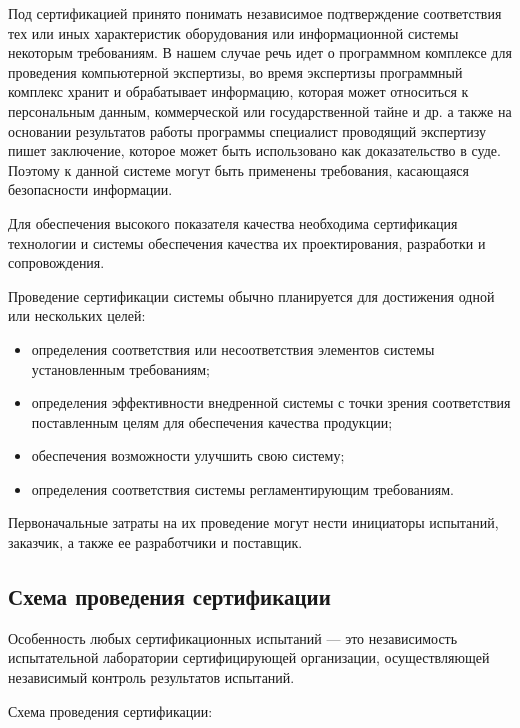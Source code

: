 Под сертификацией принято понимать независимое подтверждение соответствия тех или иных характеристик оборудования или информационной системы некоторым требованиям. В нашем случае речь идет о программном комплексе для проведения компьютерной экспертизы, во время экспертизы программный комплекс хранит и обрабатывает информацию, которая может относиться к персональным данным, коммерческой или государственной тайне и др. а также на основании результатов работы программы специалист проводящий экспертизу пишет заключение, которое может быть использовано как доказательство в суде. Поэтому к данной системе могут быть применены требования, касающаяся безопасности информации.

Для обеспечения высокого показателя качества необходима сертификация технологии и системы обеспечения качества их проектирования, разработки и сопровождения.

Проведение сертификации системы обычно планируется для достижения одной или нескольких целей:

\begin{itemize} 
\item определения соответствия или несоответствия элементов системы установленным требованиям;
\item определения эффективности внедренной системы  с точки зрения соответствия поставленным целям для обеспечения качества продукции; 
\item обеспечения возможности улучшить свою систему;
\item определения соответствия системы регламентирующим требованиям.
\end{itemize}

Первоначальные затраты на их проведение могут нести инициаторы испытаний, заказчик, а также ее разработчики и поставщик.

\subsection{Схема проведения сертификации}

Особенность любых сертификационных испытаний — это независимость испытательной лаборатории сертифицирующей организации, осуществляющей независимый контроль результатов испытаний. 

Схема проведения сертификации:

